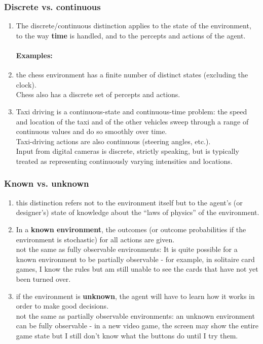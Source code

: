 \subsubsection{Discrete vs. continuous}
\begin{enumerate}
    \item The discrete/continuous distinction applies to the state of the environment, to the way \textbf{time} is handled, and to the percepts and actions of the agent.

\paragraph*{Examples:}

    \item the chess environment has a finite number of distinct states (excluding the clock).\\
    Chess also has a discrete set of percepts and actions. 
    
    \item Taxi driving is a continuous-state and continuous-time problem: the speed and location of the taxi and of the other vehicles sweep through a range of continuous values and do so smoothly over time.\\
    Taxi-driving actions are also continuous (steering angles, etc.).\\
    Input from digital cameras is discrete, strictly speaking, but is typically treated as representing continuously varying intensities and locations.
\end{enumerate}


\subsubsection{Known vs. unknown}
\begin{enumerate}
    \item this distinction refers not to the environment itself but to the agent’s (or designer’s) state of knowledge about the “laws of physics” of the environment.

    \item In a \textbf{known environment}, the outcomes (or outcome probabilities if the environment is stochastic) for all actions are given.\\
    not the same as fully observable environments: It is quite possible for a known environment to be partially observable - for example, in solitaire card games, I know the rules but am still unable to see the cards that have not yet been turned over.

    \item if the environment is \textbf{unknown}, the agent will have to learn how it works in order to make good decisions.\\
    not the same as partially observable environments: an unknown environment can be fully observable - in a new video game, the screen may show the entire game state but I still don’t know what the buttons do until I try them. 
\end{enumerate}


